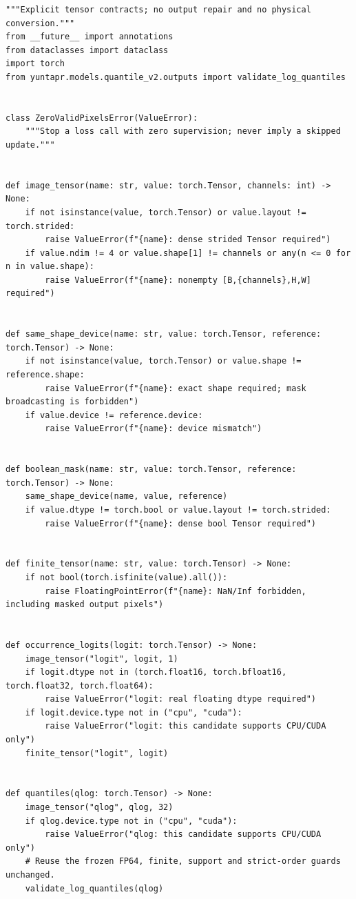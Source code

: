 \documentclass[UTF8,fontset=fandol,10pt]{ctexart}
\begin{document}
\begin{lstlisting}
"""Explicit tensor contracts; no output repair and no physical conversion."""
from __future__ import annotations
from dataclasses import dataclass
import torch
from yuntapr.models.quantile_v2.outputs import validate_log_quantiles


class ZeroValidPixelsError(ValueError):
    """Stop a loss call with zero supervision; never imply a skipped update."""


def image_tensor(name: str, value: torch.Tensor, channels: int) -> None:
    if not isinstance(value, torch.Tensor) or value.layout != torch.strided:
        raise ValueError(f"{name}: dense strided Tensor required")
    if value.ndim != 4 or value.shape[1] != channels or any(n <= 0 for n in value.shape):
        raise ValueError(f"{name}: nonempty [B,{channels},H,W] required")


def same_shape_device(name: str, value: torch.Tensor, reference: torch.Tensor) -> None:
    if not isinstance(value, torch.Tensor) or value.shape != reference.shape:
        raise ValueError(f"{name}: exact shape required; mask broadcasting is forbidden")
    if value.device != reference.device:
        raise ValueError(f"{name}: device mismatch")


def boolean_mask(name: str, value: torch.Tensor, reference: torch.Tensor) -> None:
    same_shape_device(name, value, reference)
    if value.dtype != torch.bool or value.layout != torch.strided:
        raise ValueError(f"{name}: dense bool Tensor required")


def finite_tensor(name: str, value: torch.Tensor) -> None:
    if not bool(torch.isfinite(value).all()):
        raise FloatingPointError(f"{name}: NaN/Inf forbidden, including masked output pixels")


def occurrence_logits(logit: torch.Tensor) -> None:
    image_tensor("logit", logit, 1)
    if logit.dtype not in (torch.float16, torch.bfloat16, torch.float32, torch.float64):
        raise ValueError("logit: real floating dtype required")
    if logit.device.type not in ("cpu", "cuda"):
        raise ValueError("logit: this candidate supports CPU/CUDA only")
    finite_tensor("logit", logit)


def quantiles(qlog: torch.Tensor) -> None:
    image_tensor("qlog", qlog, 32)
    if qlog.device.type not in ("cpu", "cuda"):
        raise ValueError("qlog: this candidate supports CPU/CUDA only")
    # Reuse the frozen FP64, finite, support and strict-order guards unchanged.
    validate_log_quantiles(qlog)



\end{lstlisting}
\end{document}
